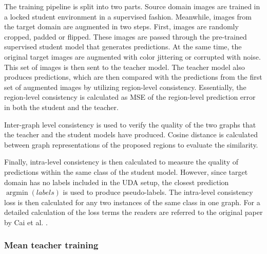 The training pipeline is split into two parts. Source domain images are trained in a locked student environment in a supervised fashion. Meanwhile, images from the target domain are augmented in two steps. First, images are randomly cropped, padded or flipped. These images are passed through the pre-trained supervised student model that generates predictions. At the same time, the original target images are augmented with color jittering or corrupted with noise. This set of images is then sent to the teacher model. The teacher model also produces predictions, which are then compared with the predictions from the first set of augmented images by utilizing region-level consistency. Essentially, the region-level consistency is calculated as MSE of the region-level prediction error in  both the student and the teacher. 

Inter-graph level consistency is used to verify the quality of the two graphs that the teacher and the student models have produced. Cosine distance  is calculated between graph representations of the proposed regions to evaluate the similarity. 

Finally, intra-level consistency is then calculated to measure the quality of predictions within the same class of the student model. However, since target domain has no labels included in the UDA setup, the closest prediction $\operatorname{argmin} (labels)$ is used to produce pseudo-labels. The intra-level consistency loss is then calculated for any two instances of the same class in one graph. For a detailed calculation of the loss terms the readers are referred to the original paper by Cai et al. \cite{Cai2019}.

\subsubsection{Mean teacher training}
\label{mean_teacher} 


